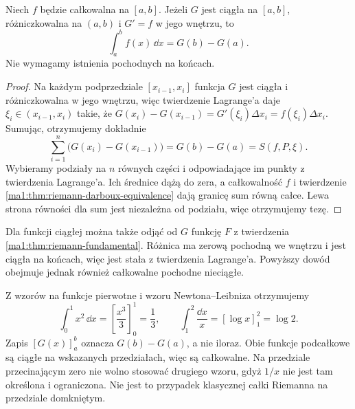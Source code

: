 \begin{twierdzenie}
\label{ma1:thm:newton-leibniz}
Niech $f$ będzie całkowalna na $[a,b]$. Jeżeli $G$ jest ciągła na $[a,b]$, różniczkowalna na $(a,b)$ i $G'=f$ w jego wnętrzu, to
\[
 \int_a^b f(x)\,\dd x=G(b)-G(a).
\]
Nie wymagamy istnienia pochodnych na końcach.
\end{twierdzenie}
\begin{proof}
Na każdym podprzedziale $[x_{i-1},x_i]$ funkcja $G$ jest ciągła i różniczkowalna w jego wnętrzu, więc twierdzenie Lagrange'a daje $\xi_i\in(x_{i-1},x_i)$ takie, że $G(x_i)-G(x_{i-1})=G'(\xi_i)\Delta x_i=f(\xi_i)\Delta x_i$. Sumując, otrzymujemy dokładnie
\[
 \sum_{i=1}^n\bigl(G(x_i)-G(x_{i-1})\bigr)
 =G(b)-G(a)=S(f,P,\xi).
\] Wybieramy podziały na $n$ równych części i odpowiadające im punkty z twierdzenia Lagrange'a. Ich średnice dążą do zera, a całkowalność $f$ i twierdzenie \ref{ma1:thm:riemann-darboux-equivalence} dają granicę sum równą całce. Lewa strona równości dla sum jest niezależna od podziału, więc otrzymujemy tezę.
\end{proof}
Dla funkcji ciągłej można także odjąć od $G$ funkcję $F$ z twierdzenia \ref{ma1:thm:riemann-fundamental}. Różnica ma zerową pochodną we wnętrzu i jest ciągła na końcach, więc jest stała z twierdzenia Lagrange'a. Powyższy dowód obejmuje jednak również całkowalne pochodne nieciągłe.

\begin{przyklad}
\label{ma1:ex:riemann-newton-leibniz}
Z wzorów na funkcje pierwotne i wzoru Newtona--Leibniza otrzymujemy
\[
 \int_0^1 x^2\,\dd x=\left[\frac{x^3}{3}\right]_0^1=\frac13,\qquad
 \int_1^2\frac{\dd x}{x}=[\log x]_1^2=\log2.
\]
Zapis $[G(x)]_a^b$ oznacza $G(b)-G(a)$, a nie iloraz. Obie funkcje podcałkowe są ciągłe na wskazanych przedziałach, więc są całkowalne. Na przedziale przecinającym zero nie wolno stosować drugiego wzoru, gdyż $1/x$ nie jest tam określona i ograniczona. Nie jest to przypadek klasycznej całki Riemanna na przedziale domkniętym.
\end{przyklad}


